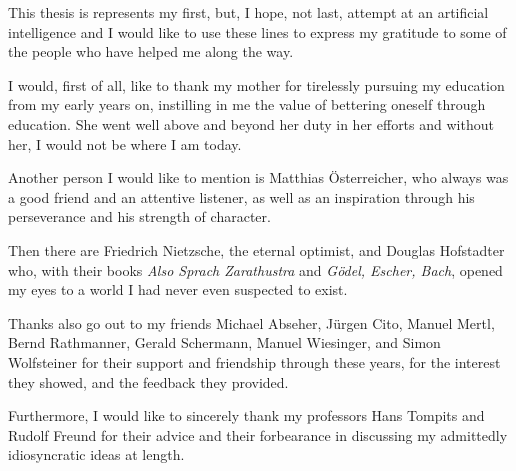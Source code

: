 \documentclass[draft,final]{vutinfth}
\begin{document}
    
    \stdlisting
	
	\frontmatter %
	
	\addstatementpage
	
	\begin{acknowledgements*}
		This thesis is represents my first, but, I hope, not last, attempt at an artificial intelligence and I would like to use these lines to express my gratitude to some of the people who have helped me along the way.
		
		I would, first of all, like to thank my mother for tirelessly pursuing my education from my early years on, instilling in me the value of bettering oneself through education. She went well above and beyond her duty in her efforts and without her, I would not be where I am today.
		
		Another person I would like to mention is Matthias \"{O}sterreicher, who always was a good friend and an attentive listener, as well as an inspiration through his perseverance and his strength of character.
		
		Then there are Friedrich Nietzsche, the eternal optimist, and Douglas Hofstadter who, with their books \emph{Also Sprach Zarathustra} and \emph{G\"{o}del, Escher, Bach}, opened my eyes to a world I had never even suspected to exist.
		
		Thanks also go out to my friends Michael Abseher, J\"{u}rgen Cito, Manuel Mertl, Bernd Rathmanner, Gerald Schermann, Manuel Wiesinger, and Simon Wolfsteiner for their support and friendship through these years, for the interest they showed, and the feedback they provided.
		
		Furthermore, I would like to sincerely thank my professors Hans Tompits and Rudolf Freund for their advice and their forbearance in discussing my admittedly idiosyncratic ideas at length.
	\end{acknowledgements*}
	
\end{document}
